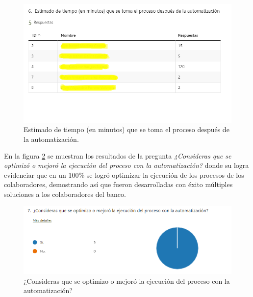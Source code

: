 \begin{figure}[H]
	\centering
	\includegraphics[scale=0.4]{Capitulo5/imagenes/7}
	\caption{Estimado de tiempo (en minutos) que se toma el proceso después de la automatización.}
	\label{fig:despues}
\end{figure}


En la figura \ref{fig:optimizo} se muestran los resultados de la pregunta \textit{¿Consideras que se optimizó o mejoró la ejecución del proceso con la automatización?} donde su logra evidenciar que en un 100\% se logró optimizar la ejecución de los procesos de los colaboradores, demostrando así que fueron desarrolladas con éxito múltiples soluciones a los colaboradores del banco.
\begin{figure}[H]
	\centering
	\includegraphics[scale=0.4]{Capitulo5/imagenes/8}
	\caption{¿Consideras que se optimizo o mejoró la ejecución del proceso con la automatización?}
	\label{fig:optimizo}
\end{figure}


